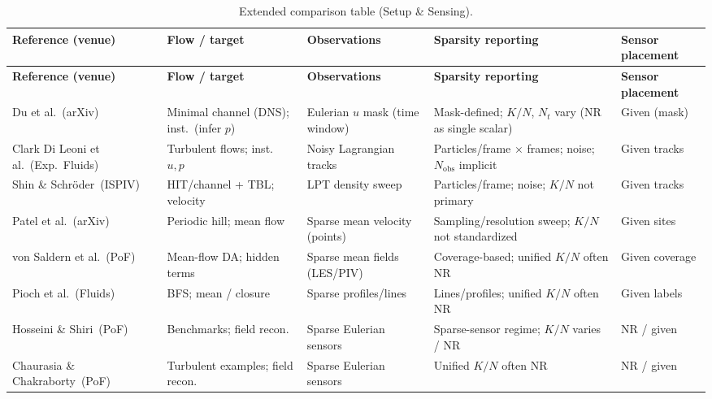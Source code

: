 \documentclass[master]{NTHUthesis}
\begin{document}
\begin{CJK*}{UTF8}{bsmi}
\begingroup
\scriptsize
\setlength{\tabcolsep}{2pt}
\renewcommand{\arraystretch}{1.15}

\begin{longtable}{
    >{\raggedright\arraybackslash}p{2.3cm}
    >{\raggedright\arraybackslash}p{2.7cm}
    >{\raggedright\arraybackslash}p{2.2cm}
    >{\raggedright\arraybackslash}p{2.6cm}
    >{\raggedright\arraybackslash}p{3.0cm}
}
\caption{Extended comparison table (Setup \& Sensing).}
\label{tab:lit_setup_sensing}\\
\toprule
\textbf{Reference (venue)} & \textbf{Flow / target} & \textbf{Observations} & \textbf{Sparsity reporting} & \textbf{Sensor placement} \\
\midrule
\endfirsthead
\toprule
\textbf{Reference (venue)} & \textbf{Flow / target} & \textbf{Observations} & \textbf{Sparsity reporting} & \textbf{Sensor placement} \\
\midrule
\endhead
Du et al.\ (arXiv)~\cite{du2022stateestimationminimalturbulent} & Minimal channel (DNS); inst.\ (infer $p$) & Eulerian $u$ mask (time window) & Mask-defined; $K/N$, $N_t$ vary (NR as single scalar) & Given (mask) \\
Clark Di Leoni et al.\ (Exp.\ Fluids)~\cite{Clark_Di_Leoni_2023} & Turbulent flows; inst.\ $u,p$ & Noisy Lagrangian tracks & Particles/frame $\times$ frames; noise; $N_{\text{obs}}$ implicit & Given tracks \\
Shin \& Schr{\"o}der\ (ISPIV)~\cite{shin2025robust} & HIT/channel + TBL; velocity & LPT density sweep & Particles/frame; noise; $K/N$ not primary & Given tracks \\
Patel et al.\ (arXiv)~\cite{patel2024turbulencemodelaugmentedphysics} & Periodic hill; mean flow & Sparse mean velocity (points) & Sampling/resolution sweep; $K/N$ not standardized & Given sites \\
von Saldern et al.\ (PoF)~\cite{von_Saldern_2022} & Mean-flow DA; hidden terms & Sparse mean fields (LES/PIV) & Coverage-based; unified $K/N$ often NR & Given coverage \\
Pioch et al.\ (Fluids)~\cite{fluids8020043} & BFS; mean / closure & Sparse profiles/lines & Lines/profiles; unified $K/N$ often NR & Given labels \\
Hosseini \& Shiri\ (PoF)~\cite{10.1063/5.0211680} & Benchmarks; field recon. & Sparse Eulerian sensors & Sparse-sensor regime; $K/N$ varies / NR & NR / given \\
Chaurasia \& Chakraborty\ (PoF)~\cite{10.1063/5.0218611} & Turbulent examples; field recon. & Sparse Eulerian sensors & Unified $K/N$ often NR & NR / given \\
\bottomrule
\end{longtable}


\end{CJK*}
\end{document}
